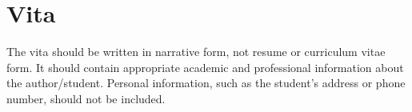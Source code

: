 \fancyhead{} %
\chapter*{Vita} \label{vita}

The vita should be written in narrative form, not resume or curriculum vitae form.
It should contain appropriate academic and professional information about the
author/student.
Personal information, such as the student's address or phone number, should not
be included.

